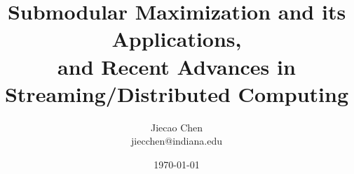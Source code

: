 \documentclass[11pt]{article}
\begin{document}
\title{Submodular Maximization and its Applications, \\ \Large{and Recent Advances in Streaming/Distributed Computing}}
\author{Jiecao Chen\\ jiecchen@indiana.edu}
\date{\today}

\maketitle






%







%
\end{document}
